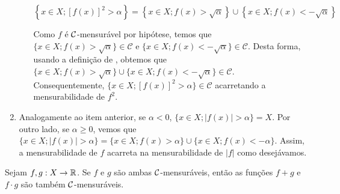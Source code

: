 \begin{prova}
\begin{enumerate}[label*=(\alph*)]
\begin{enumerate}[label = (\roman*)]
                $$\left\{x \in X; [f(x)]^2 > \alpha\right\} = \left\{x \in X; f(x)> \sqrt{\alpha}\right\}\cup \left\{x \in X; f(x)< -\sqrt{\alpha}\right\}$$
                
                Como $f$ é $\operatorname{\mathcal{C}}$-mensurável por hipótese, temos que $\{x \in X; f(x)> \sqrt{\alpha}\} \in \mathcal{C}$ e \linebreak $\{x \in X; f(x)< -\sqrt{\alpha}\} \in \mathcal{C}$.
                Desta forma, usando a definição de \sigal, obtemos que  $\{x \in X; f(x)> \sqrt{\alpha}\} \cup \{x \in X; f(x)< -\sqrt{\alpha}\} \in \mathcal{C}$. Consequentemente, 
                $\{x \in X; [f(x)]^2 > \alpha\} \in \mathcal{C}$ acarretando a mensurabilidade de $f^2$.
            \end{enumerate}
            
        \item Analogamente ao item anterior, se $\alpha < 0$, $\{x \in X; |f(x)| > \alpha\} = X$.
        Por outro lado, se $\alpha \geq 0$, vemos que 
        $\{x \in X; |f(x)| > \alpha\}=\{x \in X; f(x)> \alpha\} \cup \{x \in X; f(x)< -\alpha\}$.
        Assim, a mensurabilidade de $f$ acarreta na mensurabilidade de $|f|$ como desejávamos.
    \end{enumerate}
\end{prova}



\begin{proposition}
\label{prop:aritmetica-duas-funcoes}
    Sejam $f,g:X \to \mathbb{R}$. Se $f$ e $g$ são ambas $\operatorname{\mathcal{C}}$-mensuráveis, então as funções $f+g$ e $f\cdot g$ são também $\operatorname{\mathcal{C}}$-mensuráveis.
\end{proposition}


